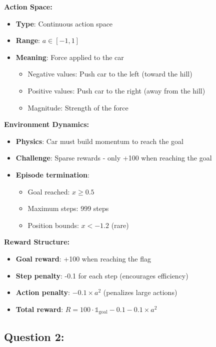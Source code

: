 \documentclass[12pt]{article}
\begin{document}
{{{\textbf{Action Space:}
\begin{itemize}
    \item \textbf{Type}: Continuous action space
    \item \textbf{Range}: $a \in [-1, 1]$
    \item \textbf{Meaning}: Force applied to the car
    \begin{itemize}
        \item Negative values: Push car to the left (toward the hill)
        \item Positive values: Push car to the right (away from the hill)
        \item Magnitude: Strength of the force
    \end{itemize}
\end{itemize}

\textbf{Environment Dynamics:}
\begin{itemize}
    \item \textbf{Physics}: Car must build momentum to reach the goal
    \item \textbf{Challenge}: Sparse rewards - only +100 when reaching the goal
    \item \textbf{Episode termination}: 
    \begin{itemize}
        \item Goal reached: $x \geq 0.5$
        \item Maximum steps: 999 steps
        \item Position bounds: $x < -1.2$ (rare)
    \end{itemize}
\end{itemize}

\textbf{Reward Structure:}
\begin{itemize}
    \item \textbf{Goal reward}: +100 when reaching the flag
    \item \textbf{Step penalty}: -0.1 for each step (encourages efficiency)
    \item \textbf{Action penalty}: $-0.1 \times a^2$ (penalizes large actions)
    \item \textbf{Total reward}: $R = 100 \cdot \mathbb{1}_{\text{goal}} - 0.1 - 0.1 \times a^2$
\end{itemize}

\subsection{Question 2:}

}}}
\end{document}
